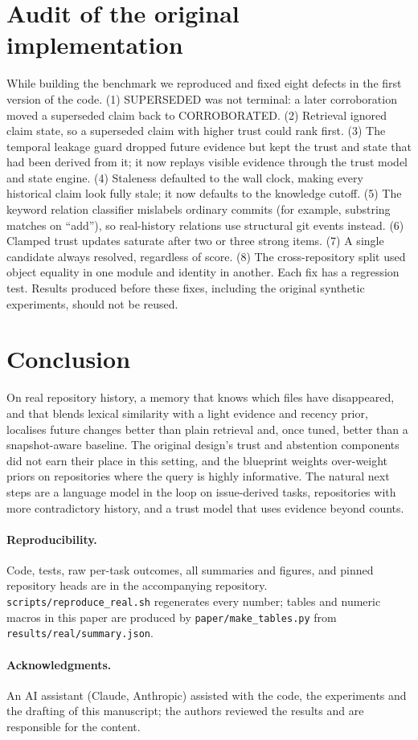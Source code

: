 \documentclass[11pt,a4paper]{article}
\begin{document}
\section{Audit of the original implementation}
\label{sec:audit}
While building the benchmark we reproduced and fixed eight defects in the first version of the code. (1) SUPERSEDED was not terminal: a later corroboration moved a superseded claim back to CORROBORATED. (2) Retrieval ignored claim state, so a superseded claim with higher trust could rank first. (3) The temporal leakage guard dropped future evidence but kept the trust and state that had been derived from it; it now replays visible evidence through the trust model and state engine. (4) Staleness defaulted to the wall clock, making every historical claim look fully stale; it now defaults to the knowledge cutoff. (5) The keyword relation classifier mislabels ordinary commits (for example, substring matches on ``add''), so real-history relations use structural git events instead. (6) Clamped trust updates saturate after two or three strong items. (7) A single candidate always resolved, regardless of score. (8) The cross-repository split used object equality in one module and identity in another. Each fix has a regression test. Results produced before these fixes, including the original synthetic experiments, should not be reused.

\section{Conclusion}
On real repository history, a memory that knows which files have disappeared, and that blends lexical similarity with a light evidence and recency prior, localises future changes better than plain retrieval and, once tuned, better than a snapshot-aware baseline. The original design's trust and abstention components did not earn their place in this setting, and the blueprint weights over-weight priors on repositories where the query is highly informative. The natural next steps are a language model in the loop on issue-derived tasks, repositories with more contradictory history, and a trust model that uses evidence beyond counts.

\paragraph{Reproducibility.} Code, tests, raw per-task outcomes, all summaries and figures, and pinned repository heads are in the accompanying repository. \texttt{scripts/}\allowbreak\texttt{reproduce\_real.sh} regenerates every number; tables and numeric macros in this paper are produced by \texttt{paper/}\allowbreak\texttt{make\_tables.py} from \texttt{results/}\allowbreak\texttt{real/}\allowbreak\texttt{summary.json}.

\paragraph{Acknowledgments.} An AI assistant (Claude, Anthropic) assisted with the code, the experiments and the drafting of this manuscript; the authors reviewed the results and are responsible for the content.



\end{document}
